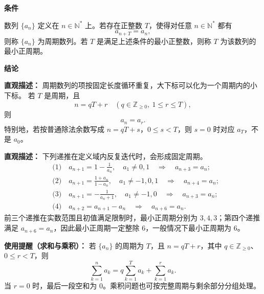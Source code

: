 \begin{statementbox}
	\textbf{\textcolor{CStatement}{条件}}
	\begin{description}[style=nextline, leftmargin=2.8em, labelsep=0.5em, itemsep=0.35em]
		\item[\textbf{\textcolor{CStatement}{条件1（周期定义）：}}]
		      数列 \(\{a_n\}\) 定义在 \(n\in\mathbb N^*\) 上。若存在正整数 \(T\)，使得对任意 \(n\in\mathbb N^*\) 都有
		      \[
			      a_{n+T}=a_n,
		      \]
		      则称 \(\{a_n\}\) 为周期数列。若 \(T\) 是满足上述条件的最小正整数，则称 \(T\) 为该数列的最小正周期。
	\end{description}

	\textbf{\textcolor{CStatement}{结论}}
	\begin{description}[style=nextline, leftmargin=2.8em, labelsep=0.5em, itemsep=0.45em]
		\item[\textbf{\textcolor{CStatement}{结论一（周期下标转化）：}}]
		      \textbf{\textcolor{CStatement}{直观描述：}}
		      周期数列的项按固定长度循环重复，大下标可以化为一个周期内的小下标。
		      若 \(T\) 是周期，且
		      \[
			      n=qT+r\quad(q\in\mathbb Z_{\ge0},\ 1\le r\le T),
		      \]
		      则
		      \[
			      a_n=a_r.
		      \]
		      特别地，若按普通除法余数写成 \(n=qT+s\)，\(0\le s<T\)，则 \(s=0\) 时对应 \(a_T\)，不是 \(a_0\)。

		\item[\textbf{\textcolor{CStatement}{推广结论（常见递推周期）：}}]
		      \textbf{\textcolor{CStatement}{直观描述：}}
		      下列递推在定义域内反复迭代时，会形成固定周期。
		      \[
			      \begin{aligned}
				       & \text{(1)}\quad a_{n+1}=1-\frac{1}{a_n},\quad a_1\ne0,1
				      \quad\Longrightarrow\quad a_{n+3}=a_n;                             \\[4pt]
				       & \text{(2)}\quad a_{n+1}=\frac{1+a_n}{1-a_n},\quad a_1\ne -1,0,1
				      \quad\Longrightarrow\quad a_{n+4}=a_n;                             \\[4pt]
				       & \text{(3)}\quad a_{n+1}=-\frac{1}{a_n+1},\quad a_1\ne -1,0
				      \quad\Longrightarrow\quad a_{n+3}=a_n;                             \\[4pt]
				       & \text{(4)}\quad a_{n+2}=a_{n+1}-a_n
				      \quad\Longrightarrow\quad a_{n+6}=a_n.
			      \end{aligned}
		      \]
		      前三个递推在实数范围且初值满足限制时，最小正周期分别为 \(3,4,3\)；第四个递推满足 \(a_{n+6}=a_n\)，因此最小正周期一定整除 \(6\)，一般情况下最小正周期为 \(6\)。
	\end{description}

	\medskip
	\textbf{\textcolor{CStatement}{使用提醒（求和与乘积）：}}
	若 \(\{a_n\}\) 的周期为 \(T\)，且 \(n=qT+r\)，其中 \(q\in\mathbb Z_{\ge0}\)、\(0\le r<T\)，则
	\[
		\sum_{k=1}^n a_k=q\sum_{k=1}^T a_k+\sum_{k=1}^r a_k.
	\]
	当 \(r=0\) 时，最后一段空和为 \(0\)。乘积问题也可按完整周期与剩余部分分组处理。
\end{statementbox}